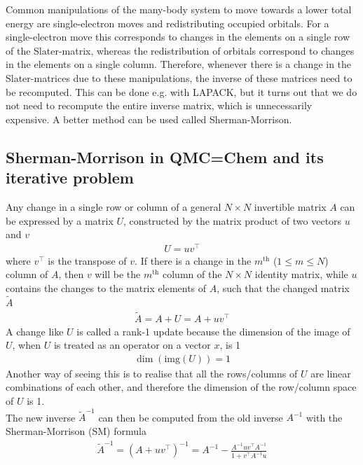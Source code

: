 \documentclass[11pt]{article}
\numberwithin{figure}{section}
\numberwithin{table}{section}
\begin{document}
			Common manipulations of the many-body system to move towards a lower total energy are single-electron moves and redistributing occupied orbitals. For a single-electron move this corresponds to changes in the elements on a single row of the Slater-matrix, whereas the redistribution of orbitals correspond to changes in the elements on a single column. Therefore, whenever there is a change in the Slater-matrices due to these manipulations, the inverse of these matrices need to be recomputed. This can be done e.g. with LAPACK, but it turns out that we do not need to recompute the entire inverse matrix, which is unnecessarily expensive. A better method can be used called Sherman-Morrison.
			
		\subsection{Sherman-Morrison in QMC=Chem and its iterative problem}\label{sec:problem}
			
			Any change in a single row or column of a general $N\times N$ invertible matrix $A$ can be expressed by a matrix $U$, constructed by the matrix product of two vectors $u$ and $v$
			\begin{align}
				U=uv^\top
			\end{align}
			where $v^\top$ is the transpose of $v$.
			If there is a change in the $m^\mathrm{th}$ ($1\leq m\leq N$) column of $A$, then $v$ will be the $m^\mathrm{th}$ column of the $N\times N$ identity matrix, while $u$ contains the changes to the matrix elements of $A$, such that the changed matrix $\widetilde{A}$
			\begin{align}
				\widetilde{A} = A + U = A + uv^\top
			\end{align}
			A change like $U$ is called a rank-1 update because the dimension of the image of $U$, when $U$ is treated as an operator on a vector $x$, is 1
			\begin{align}
				\dim(\mathrm{img}(U))=1
			\end{align}
			Another way of seeing this is to realise that all the rows/columns of $U$ are linear combinations of each other, and therefore the dimension of the row/column space of $U$ is 1.\\
			
			The new inverse $\widetilde{A}^{-1}$ can then be computed from the old inverse $A^{-1}$ with the Sherman-Morrison (SM) formula
			\begin{align}
				\widetilde{A}^{-1}=\left(A+uv^\top\right)^{-1} = A^{-1} - \frac{A^{-1}uv^\top A^{-1}}{1+v^\top A^{-1}u}
			\end{align}
			
\end{document}
